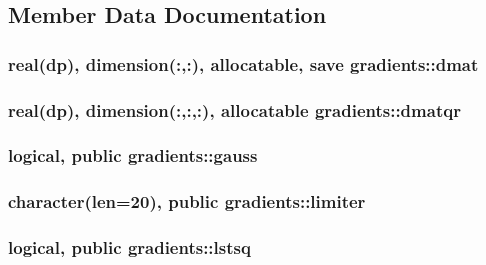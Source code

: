 \subsection{Member Data Documentation}
\hypertarget{classgradients_a0417bd090ffd38c01cbcc0d76068dd82}{
\subsubsection[{dmat}]{\setlength{\rightskip}{0pt plus 5cm}real(dp), dimension(\-:,\-:), allocatable, save gradients\-::dmat}}\label{classgradients_a0417bd090ffd38c01cbcc0d76068dd82}
\hypertarget{classgradients_a916054df6a0aaa257f536e0ef098b188}{
\subsubsection[{dmatqr}]{\setlength{\rightskip}{0pt plus 5cm}real(dp), dimension(\-:,\-:,\-:), allocatable gradients\-::dmatqr}}\label{classgradients_a916054df6a0aaa257f536e0ef098b188}
\hypertarget{classgradients_ac41921915930ac80ed01373fd760ac51}{
\subsubsection[{gauss}]{\setlength{\rightskip}{0pt plus 5cm}logical, public gradients\-::gauss}}\label{classgradients_ac41921915930ac80ed01373fd760ac51}
\hypertarget{classgradients_a47d37226aa24f4261a63b5cb1fa3d17c}{
\subsubsection[{limiter}]{\setlength{\rightskip}{0pt plus 5cm}character(len=20), public gradients\-::limiter}}\label{classgradients_a47d37226aa24f4261a63b5cb1fa3d17c}
\hypertarget{classgradients_a4ef80ad8cc52782050167ed49c332c1e}{
\subsubsection[{lstsq}]{\setlength{\rightskip}{0pt plus 5cm}logical, public gradients\-::lstsq}}\label{classgradients_a4ef80ad8cc52782050167ed49c332c1e}
